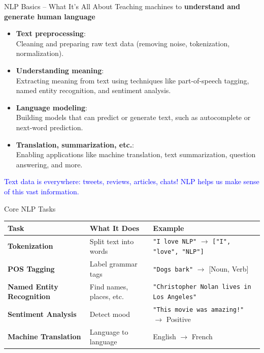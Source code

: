 \begin{frame}[allowframebreaks]{NLP Basics – What It’s All About}
    \vspace{-1em}
    Teaching machines to \textbf{understand and generate human language}
    \begin{itemize}
        \item \textbf{Text preprocessing}: \\
        {\small Cleaning and preparing raw text data (removing noise, tokenization, normalization).}
        \item \textbf{Understanding meaning}: \\
        {\small Extracting meaning from text using techniques like part-of-speech tagging, named entity recognition, and sentiment analysis.}
        \item \textbf{Language modeling}: \\
        {\small Building models that can predict or generate text, such as autocomplete or next-word prediction.}
        \item \textbf{Translation, summarization, etc.}: \\
        {\small Enabling applications like machine translation, text summarization, question answering, and more.}
    \end{itemize}

    \textcolor{blue}{Text data is everywhere: tweets, reviews, articles, chats! NLP helps us make sense of this vast information.}

\end{frame}

\begin{frame}[allowframebreaks]{Core NLP Tasks}
\begin{table}[ht]
    \centering
    \renewcommand{\arraystretch}{1.8} %
    \begin{tabular}{@{} p{} p{} p{} @{}}
        \toprule
        \textbf{Task} & \textbf{What It Does} & \textbf{Example} \\
        \midrule
        \hline %
        \textbf{Tokenization} & Split text into words & \texttt{"I love NLP"} $\rightarrow$ \texttt{["I", "love", "NLP"]} \\
        \textbf{POS Tagging} & Label grammar tags & \texttt{"Dogs bark"} $\rightarrow$ [Noun, Verb] \\
        \textbf{Named Entity Recognition} & Find names, places, etc. & \texttt{"Christopher Nolan lives in Los Angeles"} \\
        \textbf{Sentiment Analysis} & Detect mood & \texttt{"This movie was amazing!"} $\rightarrow$ Positive \\
        \textbf{Machine Translation} & Language to language & English $\rightarrow$ French \\
        \bottomrule
    \end{tabular}
\end{table}
\end{frame}


